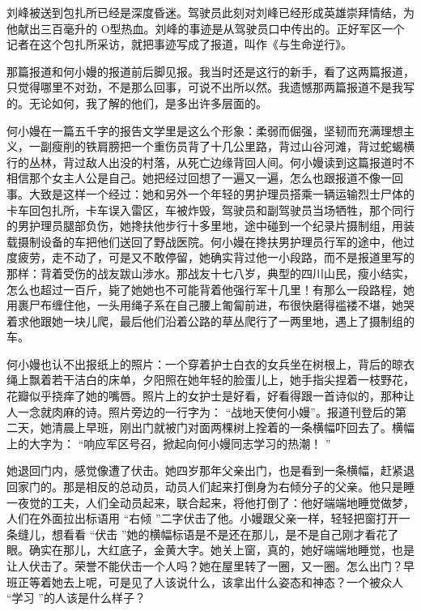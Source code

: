 \documentclass[12pt,twoside,openany]{book}
\begin{document}
刘峰被送到包扎所已经是深度昏迷。驾驶员此刻对刘峰已经形成英雄崇拜情结，为他献出三百毫升的 O型热血。刘峰的事迹是从驾驶员口中传出的。正好军区一个记者在这个包扎所采访，就把事迹写成了报道，叫作《与生命逆行》。

那篇报道和何小嫚的报道前后脚见报。我当时还是这行的新手，看了这两篇报道，只觉得哪里不对劲，不是那么回事，可说不出所以然。我遗憾那两篇报道不是我写的。无论如何，我了解的他们，是多出许多层面的。

何小嫚在一篇五千字的报告文学里是这么个形象：柔弱而倔强，坚韧而充满理想主义，一副瘦削的铁肩膀把一个重伤员背了十几公里路，背过山谷河滩，背过蛇蝎横行的丛林，背过敌人出没的村落，从死亡边缘背回人间。何小嫚读到这篇报道时不相信那个女主人公是自己。她把经过回想了一遍又一遍，怎么也跟报道不像一回事。大致是这样一个经过：她和另外一个年轻的男护理员搭乘一辆运输烈士尸体的卡车回包扎所，卡车误入雷区，车被炸毁，驾驶员和副驾驶员当场牺牲，那个同行的男护理员腿部负伤，她搀扶他步行十多里地，途中碰到一个纪录片摄制组，用装载摄制设备的车把他们送回了野战医院。何小嫚在搀扶男护理员行军的途中，他过度疲劳，走不动了，可是又不敢停留，她确实背过他一小段路，而不是报道里写的那样：背着受伤的战友跋山涉水。那战友十七八岁，典型的四川山民，瘦小结实，怎么也超过一百斤，毙了她她也不可能背着他强行军十几里！有那么一段路程，她用裹尸布缠住他，一头用绳子系在自己腰上匍匐前进，布很快磨得褴褛不堪，她哭着求他跟她一块儿爬，最后他们沿着公路的草丛爬行了一两里地，遇上了摄制组的车。

何小嫚也认不出报纸上的照片：一个穿着护士白衣的女兵坐在树根上，背后的晾衣绳上飘着若干洁白的床单，夕阳照在她年轻的脸蛋儿上，她手指尖捏着一枝野花，花瓣似乎挠痒了她的嘴唇。照片上的女护士是好看，好看得跟一首诗似的，那种让人一念就肉麻的诗。照片旁边的一行字为： “战地天使何小嫚”。报道刊登后的第二天，她清晨上早班，刚出门就被门对面两棵树上拴着的一条横幅吓回去了。横幅上的大字为： “响应军区号召，掀起向何小嫚同志学习的热潮！ ”

她退回门内，感觉像遭了伏击。她四岁那年父亲出门，也是看到一条横幅，赶紧退回家门的。那是相反的总动员，动员人们起来打倒身为右倾分子的父亲。他只是睡一夜觉的工夫，人们全动员起来，联合起来，将他打倒了：他好端端地睡觉做梦，人们在外面拉出标语用 “右倾 ”二字伏击了他。小嫚跟父亲一样，轻轻把窗打开一条缝儿，想看看 “伏击 ”她的横幅标语是不是还在那儿，是不是自己刚才看花了眼。确实在那儿，大红底子，金黄大字。她关上窗，真的，她好端端地睡觉，也是让人伏击了。荣誉不能伏击一个人吗？她在屋里转了一圈，又一圈。怎么出门？早班正等着她去上呢，可是见了人该说什么，该拿出什么姿态和神态？一个被众人 “学习 ”的人该是什么样子？
\end{document}
